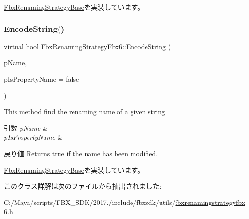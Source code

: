 \hyperlink{class_fbx_renaming_strategy_base_a7449fa6c649949d6d5e3c4b7190d6b25}{Fbx\+Renaming\+Strategy\+Base}を実装しています。

\mbox{\label{class_fbx_renaming_strategy_fbx6_aee897659c210920eefbcb899b8b463d6}} 
\subsubsection{\texorpdfstring{Encode\+String()}{EncodeString()}}
{\footnotesize\ttfamily virtual bool Fbx\+Renaming\+Strategy\+Fbx6\+::\+Encode\+String (\begin{DoxyParamCaption}\item[{\hyperlink{class_fbx_name_handler}{Fbx\+Name\+Handler} \&}]{p\+Name,  }\item[{bool}]{p\+Is\+Property\+Name = {\ttfamily false} }\end{DoxyParamCaption})\hspace{0.3cm}{\ttfamily [virtual]}}

This method find the renaming name of a given string 
\begin{DoxyParams}{引数}
{\em p\+Name} & \\
\hline
{\em p\+Is\+Property\+Name} & \\
\hline
\end{DoxyParams}
\begin{DoxyReturn}{戻り値}
Returns true if the name has been modified. 
\end{DoxyReturn}


\hyperlink{class_fbx_renaming_strategy_base_aa762726a9d92a328ec720f2b8135db09}{Fbx\+Renaming\+Strategy\+Base}を実装しています。



このクラス詳解は次のファイルから抽出されました\+:\begin{DoxyCompactItemize}
\item 
C\+:/\+Maya/scripts/\+F\+B\+X\+\_\+\+S\+D\+K/2017./include/fbxsdk/utils/\hyperlink{fbxrenamingstrategyfbx6_8h}{fbxrenamingstrategyfbx6.\+h}\end{DoxyCompactItemize}
